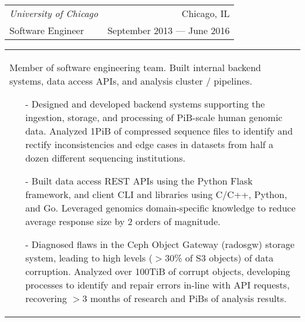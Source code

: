 \begin{tabularx}{\textwidth}{L R}
    \normalsize\textit{University of Chicago} & Chicago, IL \\
    \hspace{10pt}Software Engineer & September 2013 --- June 2016 \\
\end{tabularx}
\begin{tabularx}{\textwidth}{X}
    \vspace{1pt}
    Member of software engineering team. Built internal backend systems, data access APIs, and analysis cluster / pipelines.
    \begin{itemize}
        \itemsep{}
        \item[-] Designed and developed backend systems supporting the ingestion, storage, and processing of PiB-scale human genomic data. Analyzed 1PiB of compressed sequence files to identify and rectify inconsistencies and edge cases in datasets from half a dozen different sequencing institutions.
        \item[-] Built data access REST APIs using the Python Flask framework, and client CLI and libraries using C/C++, Python, and Go. Leveraged genomics domain-specific knowledge to reduce average response size by 2 orders of magnitude.
        \item[-] Diagnosed flaws in the Ceph Object Gateway (radosgw) storage system, leading to high levels ($>$30\% of S3 objects) of data corruption. Analyzed over 100TiB of corrupt objects, developing processes to identify and repair errors in-line with API requests, recovering $>$3 months of research and PiBs of analysis results.
    \end{itemize}
\end{tabularx}
